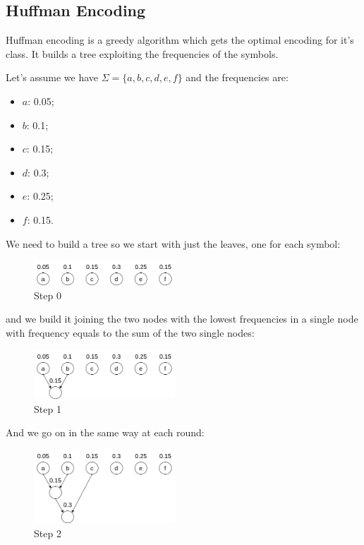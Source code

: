 \subsection{Huffman Encoding}
Huffman encoding is a greedy algorithm which gets the optimal encoding for it's class.
It builds a tree exploiting the frequencies of the symbols.

Let's assume we have $\Sigma=\{a, b, c, d, e, f\}$ and the frequencies are:
\begin{itemize}
    \item $a$: 0.05;
    \item $b$: 0.1;
    \item $c$: 0.15;
    \item $d$: 0.3;
    \item $e$: 0.25;
    \item $f$: 0.15.
\end{itemize}

We need to build a tree so we start with just the leaves, one for each symbol:
\begin{figure}[H]
    \centering
    \includegraphics[width=200px]{images/10_Data_compression/huffman_0.png}
    \caption{Step 0}
\end{figure}
and we build it joining the two nodes with the lowest frequencies in a single node with frequency equals to the sum of the two single nodes:
\begin{figure}[H]
    \centering
    \includegraphics[width=200px]{images/10_Data_compression/huffman_1.png}
    \caption{Step 1}
\end{figure}
And we go on in the same way at each round:
\begin{figure}[H]
    \centering
    \includegraphics[width=200px]{images/10_Data_compression/huffman_2.png}
    \caption{Step 2}
\end{figure}

